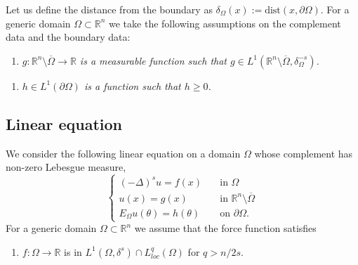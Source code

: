 \documentclass{amsart}
\makeatletter
\newcommand{\R}{\mathbb{R}}
\newcommand{\slap}{(-\Delta)^{s}}
\newcommand{\myitem}[1]{%
\medskip \item[#1]\protected@edef\@currentlabel{#1}%
}
\makeatother
\begin{document}
\medskip 


 Let us define the distance from the boundary as $\delta_{\Omega} (x) := \text{dist}(x,\partial\Omega)$. For a generic domain $\Omega \subset \R^n$ we take the following assumptions on the complement data and the boundary data:

 \begin{enumerate}
    \myitem{$\textbf{(G)}$} \label{G}\textit{ $g:\R^{n}\setminus\overline{\Omega} \to \R$ is a measurable function such that $g\in L^{1}(\R^{n}\setminus\overline{\Omega},\delta_{\Omega}^{-s})$.}
\end{enumerate}
\begin{enumerate}
    \myitem{$\textbf{(H)}$}\label{H} \textit{ $h\in L^{1}(\partial\Omega)$ is a function  such that $h\geq 0$.} 
\end{enumerate}

\subsection{Linear equation}
We consider the following linear equation on a domain $\Omega$ whose complement has non-zero Lebesgue measure,
\begin{equation}\label{eqn main linear omega}
\begin{cases}
\slap u=f(x) \quad &\text{in }\Omega\\
u(x)=g(x) &\text{in }\R^{n}\setminus\overline{\Omega}\\
E_{\Omega}u(\theta)=h(\theta) &\text{on }\partial\Omega.
\end{cases}
\end{equation}
For a generic domain $\Omega \subset \R^n$ we assume that the force function satisfies
\begin{enumerate}
    \myitem{$\textbf{(F1)}$}\label{F1} 
    $f:\Omega\to \R$ is in $L^{1}(\Omega,\delta^{s})\cap L^{q}_{loc}(\Omega)$ for $q>n/2s$.
\end{enumerate}
\medskip 
\end{document}

